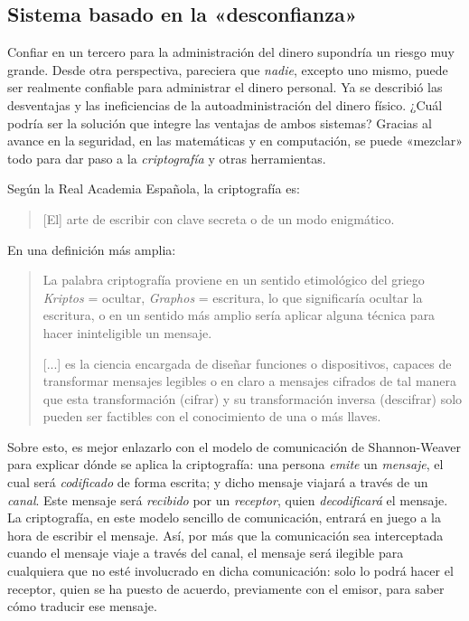 \documentclass[12pt,a4paper,twoside]{book}
\begin{document}
\subsection{Sistema basado en la «desconfianza»}
Confiar en un tercero para la administración del dinero supondría un riesgo muy grande. Desde otra perspectiva, pareciera que \textit{nadie}, excepto uno mismo, puede ser realmente confiable para administrar el dinero personal. Ya se describió las desventajas y las ineficiencias de la autoadministración del dinero físico. ¿Cuál podría ser la solución que integre las ventajas de ambos sistemas? Gracias al avance en la seguridad, en las matemáticas y en computación, se puede «mezclar» todo para dar paso a la \textit{criptografía} y otras herramientas.

Según la Real Academia Española, la criptografía es:

\begin{quote}
[El] arte de escribir con clave secreta o de un modo enigmático. \cite{rae}
\end{quote}

En una definición más amplia:

\begin{quotation}
La palabra criptografía proviene en un sentido etimológico del griego \textit{Kriptos} = ocultar, \textit{Graphos} = escritura, lo que significaría ocultar la escritura, o en un sentido más amplio sería aplicar alguna técnica para hacer ininteligible un mensaje.

[...] es la ciencia encargada de diseñar funciones o dispositivos, capaces de transformar mensajes legibles o en claro a mensajes cifrados de tal manera que esta transformación (cifrar) y su transformación inversa (descifrar) solo pueden ser factibles con el conocimiento de una o más llaves. \cite[pág. 6]{introcripto}
\end{quotation}

Sobre esto, es mejor enlazarlo con el modelo de comunicación de Shannon-Weaver para explicar dónde se aplica la criptografía: una persona \textit{emite} un \textit{mensaje}, el cual será \textit{codificado} de forma escrita; y dicho mensaje viajará a través de un \textit{canal}. Este mensaje será \textit{recibido} por un \textit{receptor}, quien \textit{decodificará} el mensaje. La criptografía, en este modelo sencillo de comunicación, entrará en juego a la hora de escribir el mensaje. Así, por más que la comunicación sea interceptada cuando el mensaje viaje a través del canal, el mensaje será ilegible para cualquiera que no esté involucrado en dicha comunicación: solo lo podrá hacer el receptor, quien se ha puesto de acuerdo, previamente con el emisor, para saber cómo traducir ese mensaje.
\end{document}
